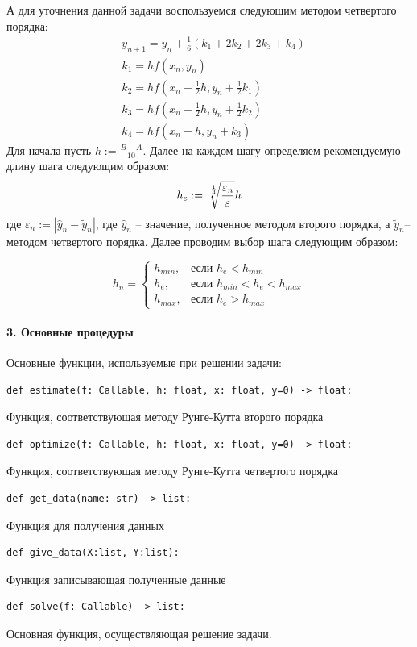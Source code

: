 \documentclass[11pt,a4paper]{report}
\begin{document}
А для уточнения данной задачи воспользуемся следующим методом четвертого порядка:
\[
\begin{aligned}
&y_{n+1} = y_n + \frac{1}{6}(k_1 + 2k_2 + 2k_3 + k_4)\\
&k_1 = hf(x_n,y_n)\\
&k_2 = hf(x_n + \frac{1}{2}h, y_n + \frac{1}{2}k_1)\\
&k_3 = hf(x_n + \frac{1}{2}h, y_n + \frac{1}{2}k_2)\\
&k_4 = hf(x_n + h, y_n + k_3)
\end{aligned}
\]
Для начала пусть $ h := \frac{B - A}{10} $. Далее на каждом шагу определяем рекомендуемую длину шага следующим образом:
\[
h_e := \sqrt[\leftroot{-2}\uproot{5}\frac{1}{4}]{\frac{\varepsilon_n}{\varepsilon}}h
\]
где $ \varepsilon_n := |\hat{y}_n - \tilde{y}_n | $, где $\hat{y}_n$ -- значение, полученное методом второго порядка, а $\tilde{y}_n$-- методом четвертого порядка. Далее проводим выбор шага следующим образом:

\[
h_n = \begin{cases}
	h_{min}, & \text{если $h_e < h_{min}$} \\
	h_e, & \text{если $h_{min} < h_e < h_{max}$} \\
	h_{max}, & \text{если $h_e > h_{max}$}
\end{cases}
\]

\paragraph{3. Основные процедуры}
Основные функции, используемые при решении задачи:


\begin{lstlisting}
def estimate(f: Callable, h: float, x: float, y=0) -> float:
\end{lstlisting}
Функция, соответствующая методу Рунге-Кутта второго порядка
\begin{lstlisting}
def optimize(f: Callable, h: float, x: float, y=0) -> float:
\end{lstlisting}
Функция, соответствующая методу Рунге-Кутта четвертого порядка
\begin{lstlisting}
def get_data(name: str) -> list:
\end{lstlisting}
Функция для получения данных
\begin{lstlisting}
def give_data(X:list, Y:list):
\end{lstlisting}
Функция записывающая полученные данные
\begin{lstlisting}
def solve(f: Callable) -> list:
\end{lstlisting}
Основная функция, осуществляющая решение задачи.
\end{document}
